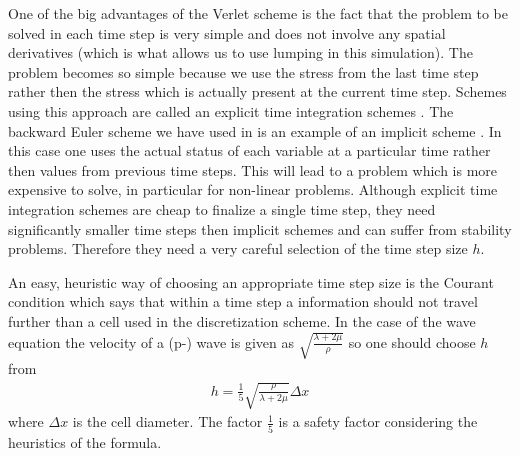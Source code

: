 One of the big advantages of the Verlet scheme is the fact that the problem to be solved 
in each time step is very simple and does not involve any spatial derivatives (which is what allows us to use lumping in this simulation).
The problem becomes so simple because we use the stress from the last time step rather then the stress which is
actually present at the current time step. Schemes using this approach are called an explicit time integration 
schemes  . The 
backward Euler scheme we have used in  is 
an example of an implicit scheme
 . In this case one uses the actual status of 
each variable at a particular time rather then values from previous time steps. This will lead to a problem which is 
more expensive to solve, in particular for non-linear problems. 
Although 
explicit time integration schemes are cheap to finalize a single time step, they need significantly smaller time
steps then implicit schemes and can suffer from stability problems. Therefore they need a 
very careful selection of the time step size $h$.

An easy, heuristic way of choosing an appropriate
time step size is the Courant condition  
which says that within a time step a information should not travel further than a cell used in the 
discretization scheme. In the case of the wave equation the velocity of a (p-) wave is given as
$\sqrt{\frac{\lambda+2\mu}{\rho}}$ so one should choose $h$ from
\begin{eqnarray}\label{WAVE dyn 66}
h= \frac{1}{5} \sqrt{\frac{\rho}{\lambda+2\mu}} \Delta x
\end{eqnarray}
where $\Delta x$ is the cell diameter. The factor $\frac{1}{5}$ is a safety factor considering the heuristics of 
the formula. 

